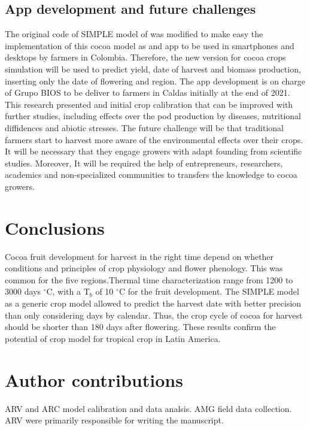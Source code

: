 \documentclass[gene,journal,article,submit,moreauthors,pdftex]{Definitions/mdpi}
\begin{document}
\subsection{App development and future challenges }
The original code of SIMPLE model of \citep{Zao2019simple} was modified to make easy the implementation of this cocoa model as and app to be used in smartphones and desktops by farmers in Colombia. Therefore, the new version for cocoa crops simulation will be used to predict yield, date of harvest and biomass production, inserting only the date of flowering and region. The app development is on charge of Grupo BIOS to be deliver to farmers in Caldas initially at the end of 2021. 
This research presented and initial crop calibration that can be improved with further studies, including effects over the pod production by diseases, nutritional diffidences and abiotic stresses. The future challenge will be that traditional farmers start to harvest more aware of the environmental effects over their crops. It will be necessary that they engage growers with adapt founding from scientific studies. Moreover, It will be required the help of entrepreneurs, researchers, academics and non-specialized communities to transfers the knowledge to cocoa growers.
\section{Conclusions}
Cocoa fruit development for harvest in the right time depend on whether conditions and principles of crop physiology and flower phenology.  This was common for the five regions.Thermal time characterization range from 1200 to 3000 days $^\circ$C, with a T$_{b}$ of 10 $^\circ$C for the fruit development.  The SIMPLE model as a generic crop model allowed to predict the harvest date with better precision than only considering days by calendar. Thus, the crop cycle of cocoa for harvest  should be shorter than 180 days after flowering. These results confirm the potential of crop model for tropical crop in Latin America.

\section{Author contributions}
ARV and ARC model calibration and data analsis. AMG field data collection. ARV were primarily responsible for writing the manuscript.

\end{document}
